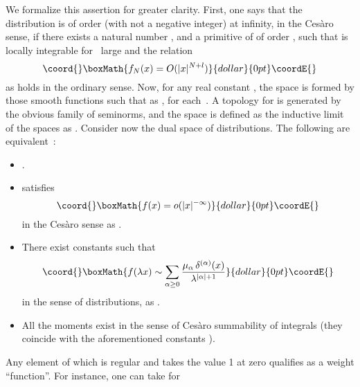 \documentclass[a4paper,12pt]{article}
\renewcommand{\a}{\alpha}          %
\providecommand{\del}{\partial}        %
\providecommand{\dl}{\delta}           %
\providecommand{\ga}{\gamma}           %
\providecommand{\K}{\mathcal{K}}       %
\providecommand{\la}{\lambda}          %
\providecommand{\7}{\dagger}           %
\def\<#1,#2>{\langle#1,#2\rangle}  %
\theoremstyle{plain}
\theoremstyle{definition}
\begin{document}
We formalize this assertion for greater clarity. First, one says that
the distribution \coordHE{} is of order \coordHE{} (with \coordHE{} not a negative
integer) at infinity, in the Ces\`aro sense, if there exists a natural
number \coordHE{}, and a primitive \coordHE{} of \coordHE{} of order \coordHE{}, such that \coordHE{}
is locally integrable for \coordHE{}~large and the relation
$$\coord{}\boxMath{
f_N(x) = O(|x|^{N+l})
}{dollar}{0pt}\coordE{}$$
as \coordHE{} holds in the ordinary sense. Now, for any real
constant \myHighlight{$\ga$}\coordHE{}, the space \myHighlight{$\K_\ga$}\coordHE{} is formed by those smooth functions
\myHighlight{$\phi$}\coordHE{} such that \myHighlight{$\del^\a\phi(x) = O(|x|^{\ga - |\a|})$}\coordHE{} as
\coordHE{}, for each~\myHighlight{$|\a|$}\coordHE{}. A topology for \myHighlight{$\K_\ga$}\coordHE{} is
generated by the obvious family of seminorms, and the space \myHighlight{$\K$}\coordHE{} is
defined as the inductive limit of the spaces \myHighlight{$\K_\ga$}\coordHE{} as
\myHighlight{$\ga \uparrow\infty$}\coordHE{}. Consider now the dual space \myHighlight{$\K'$}\coordHE{} of
distributions. The following are
equivalent~\cite{Odysseus,CesarRicardo}:
\vfill\eject
\begin{itemize}
\item
\myHighlight{$f \in \K'$}\coordHE{}.
\item
{}\coordHE{} satisfies
$$\coord{}\boxMath{
f(x) = o(|x|^{-\infty})
}{dollar}{0pt}\coordE{}$$
in the Ces\`aro sense as \coordHE{}.
\item
There exist constants \myHighlight{$\mu_\a$}\coordHE{} such that
$$\coord{}\boxMath{
f(\la x) \sim \sum_{\a\geq0} \frac{\mu_\a\,\dl^{(\a)}(x)}{\la^{|\a|+1}}
}{dollar}{0pt}\coordE{}$$
in the sense of distributions, as \myHighlight{$\la \uparrow\infty$}\coordHE{}.
\item
All the moments \myHighlight{$\<f(x), x^\a>$}\coordHE{} exist in the sense of Ces\`aro
summability of integrals (they coincide with the aforementioned
constants \myHighlight{$\mu_\a$}\coordHE{}).
\end{itemize}
Any element of \myHighlight{$\K'$}\coordHE{} which is regular and takes the value 1 at zero
qualifies as a weight ``function''. For instance, one can take for \coordHE{}
\end{document}

